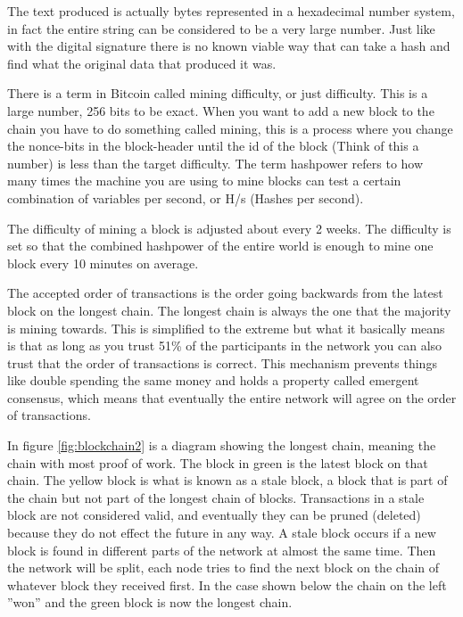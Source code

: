 The text produced is actually bytes represented in a hexadecimal number system,
in fact the entire string can be considered to be a very large number. Just like
with the digital signature there is no known viable way that can take a hash and
find what the original data that produced it was.

There is a term in Bitcoin called mining difficulty, or just difficulty. This
is a large number, 256 bits to be exact. When you want to add a new block to
the chain you have to do something called mining, this is a process where you
change the nonce-bits in the block-header until the id of the block (Think
of this a number) is less than the target difficulty. The term hashpower refers
to how many times the machine you are using to mine blocks can test a certain
combination of variables per second, or H/s (Hashes per second).

The difficulty of mining a block is adjusted about every 2 weeks. The difficulty
is set so that the combined hashpower of the entire world is enough to mine one
block every 10 minutes on average.\cite{antonopoulos_2017}

The accepted order of transactions is the order going backwards from the latest
block on the longest chain. The longest chain is always the one that the majority
is mining towards. This is simplified to the extreme but what it basically
means is that as long as you trust 51\% of the participants in the network you
can also trust that the order of transactions is correct. This mechanism
prevents things like double spending the same money and holds a property called
emergent consensus, which means that eventually the entire network will agree
on the order of transactions.

In figure \ref{fig:blockchain2} is a diagram showing the longest chain, meaning
the chain with most proof of work. The block in green is the latest block on
that chain. The yellow block is what is known as a stale block, a block that is
part of the chain but not part of the longest chain of blocks. Transactions in
a stale block are not considered valid, and eventually they can be pruned
(deleted) because they do not effect the future in any way. A stale block occurs
if a new block is found in different parts of the network at almost the same
time. Then the network will be split, each node tries to find the next block on
the chain of whatever block they received first. In the case shown below the
chain on the left ''won'' and the green block is now the longest chain.

